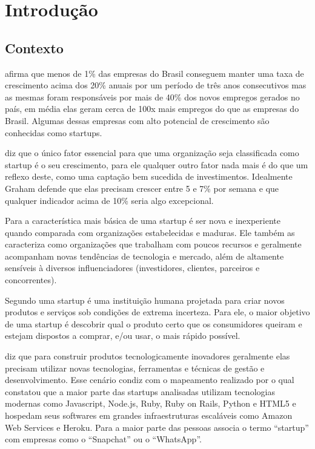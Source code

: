 \chapter{Introdução}
\label{cap-introducao}

\section{Contexto}
\label{section:contexto}

 afirma que menos de 1\% das empresas do Brasil conseguem manter uma taxa de crescimento acima dos 20\% anuais por um período de três anos consecutivos mas as mesmas foram responsáveis por mais de 40\% dos novos empregos gerados no país, em média elas geram cerca de 100x mais empregos do que as empresas do Brasil. Algumas dessas empresas com alto potencial de crescimento são conhecidas como startups.

 diz que o único fator essencial para que uma organização seja classificada como startup é o seu crescimento, para ele qualquer outro fator nada mais é do que um reflexo deste, como uma captação bem sucedida de investimentos. Idealmente Graham defende que elas precisam crescer entre 5 e 7\% por semana e que qualquer indicador acima de 10\% seria algo excepcional.

Para  a característica mais básica de uma startup é ser nova e inexperiente quando comparada com organizações estabelecidas e maduras. Ele também as caracteriza como organizações que trabalham com poucos recursos e geralmente acompanham novas tendências de tecnologia e mercado, além de altamente sensíveis à diversos influenciadores (investidores, clientes, parceiros e concorrentes).

Segundo  uma startup é uma instituição humana projetada para criar novos produtos e serviços sob condições de extrema incerteza. Para ele, o maior objetivo de uma startup é descobrir qual o produto certo que os consumidores queiram e estejam dispostos a comprar, e/ou usar, o mais rápido possível.

 diz que para construir produtos tecnologicamente inovadores geralmente elas precisam utilizar novas tecnologias, ferramentas e técnicas de gestão e desenvolvimento. Esse cenário condiz com o mapeamento realizado por  o qual constatou que a maior parte das startups analisadas utilizam tecnologias modernas como Javascript, Node.js, Ruby, Ruby on Rails, Python e HTML5 e hospedam seus softwares em grandes infraestruturas escaláveis como Amazon Web Services e Heroku. Para  a maior parte das pessoas associa o termo ``startup'' com empresas como o ``Snapchat'' ou o ``WhatsApp''.

